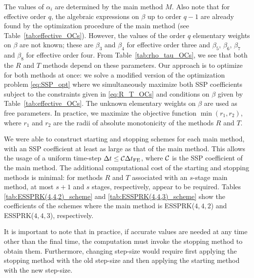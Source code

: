 \documentclass{siamltex}  %
\begin{document}
The values of $\alpha_i$ are determined by the main method $M$.
Also note that for effective order $q$, the algebraic expressions on
$\beta$ up to order $q-1$ are already found by the optimization procedure of 
the main method (see Table~\ref{tab:effective_OCs}). 
However, the values of the order $q$ elementary weights on $\beta$ are not 
known; these are $\beta_3$ and $\beta_4$ for effective order three and
$\beta_5$, $\beta_6$, $\beta_7$ and $\beta_8$ for effective order four.
From Table~\ref{tab:rho_tau_OCs}, we see that both the $R$ and $T$
methods depend on these parameters.
Our approach is to optimize for both methods at once: we solve a
modified version of the optimization problem \eqref{eq:SSP_opt} where
we simultaneously maximize both SSP coefficients subject to the
constraints given in \eqref{eq:R_T_OCs} and conditions on $\beta$ given by 
Table~\ref{tab:effective_OCs}. 
The unknown elementary weights on $\beta$ are used as free parameters.
In practice, we maximize the objective function $\min(r_1,r_2)$, where $r_1$ 
and $r_2$ are the radii of absolute monotonicity of the methods $R$ and $T$.

We were able to construct starting and stopping schemes for each main 
method, with an SSP coefficient at least as large as that of the main method.
This allows the usage of a uniform time-step $\Delta t \leq \mathcal{C}\Delta t_{\textnormal{FE}}$, 
where $\mathcal{C}$ is the SSP coefficient of the main method.
The additional computational cost
of the starting and stopping methods is minimal:
for methods $R$ and $T$ associated with an $s$-stage main method,
at most $s + 1$ and $s$ stages, respectively, appear to be required.
Tables \ref{tab:ESSPRK(4,4,2)_scheme} and \ref{tab:ESSPRK(4,4,3)_scheme} 
show the coefficients of the schemes where the main 
method is ESSPRK($4,4,2$) and ESSPRK($4,4,3$), respectively. 

It is important to note that in practice, if accurate values are needed at 
any time other than the final time, the computation must invoke the 
stopping method to obtain them.  Furthermore, changing step-size would 
require first applying the stopping method with the old step-size and then 
applying the starting method with the new step-size.
\end{document}
